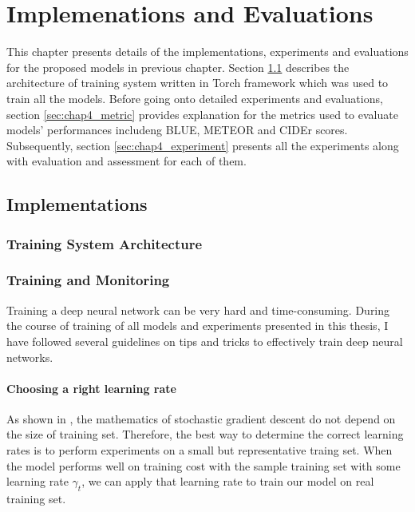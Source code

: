 \chapter{Implemenations and Evaluations}

This chapter presents details of the implementations, experiments and evaluations for the proposed models in previous chapter. Section \ref{sec:chap4_implementation} describes the architecture of training system written in Torch framework which was used to train all the models. Before going onto detailed experiments and evaluations, section \ref{sec:chap4_metric} provides explanation for the metrics used to evaluate models' performances includeng BLUE, METEOR and CIDEr scores. Subsequently, section \ref{sec:chap4_experiment} presents all the experiments along with evaluation and assessment for each of them.

\section{Implementations}
\label{sec:chap4_implementation}


\subsection{Training System Architecture}

\subsection{Training and Monitoring}
Training a deep neural network can be very hard and time-consuming. During the course of training of all models and experiments presented in this thesis, I have followed several guidelines \cite{bottou-tricks-2012} on tips and tricks to effectively train deep neural networks.
	\subsubsection{Choosing a right learning rate}
	As shown in \cite{Murata98astatistical}, the mathematics of stochastic gradient descent do not depend on the size of training set. Therefore, the best way to determine the correct learning rates is to perform experiments on a small but representative traing set. When the model performs well on training cost with the sample training set with some learning rate $\gamma_t$, we can apply that learning rate to train our model on real training set.

